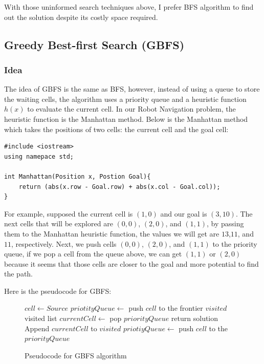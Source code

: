 \documentclass{assignment}
\begin{document}
With those uninformed search techniques above, I prefer BFS algorithm to find out the solution despite its costly space required. 

\subsection{Greedy Best-first Search (GBFS)}

\subsubsection{Idea}
The idea of GBFS is the same as BFS, however, instead of using a queue to store the waiting cells, the algorithm uses a priority queue and a heuristic function $h(x)$ to evaluate the current cell. In our Robot Navigation problem, the heuristic function is the Manhattan method. Below is the Manhattan method which takes the positions of two cells: the current cell and the goal cell:

\begin{lstlisting}[caption={Manhattan Function in C++}]
#include <iostream>
using namepace std;

int Manhattan(Position x, Postion Goal){
	return (abs(x.row - Goal.row) + abs(x.col - Goal.col));
}
\end{lstlisting}

For example, supposed the current cell is $(1, 0)$ and our goal is $(3, 10)$. The next cells that will be explored are $(0, 0)$, $(2, 0)$, and $(1, 1)$, by passing them to the Manhattan heuristic function, the values we will get are $13$,$11$, and $11$, respectively. Next, we push cells $(0, 0)$, $(2, 0)$, and $(1, 1)$ to the priority queue, if we pop a cell from the queue above, we can get $(1, 1)$ or $(2, 0)$ because it seems that those cells are closer to the goal and more potential to find the path.

Here is the pseudocode for GBFS:

\begin{figure}[htbp]
    \centering
    \begin{mdframed}
      \begin{algorithmic}
        \STATE $cell \gets Source$
        \STATE $priotityQueue \gets $ push $cell$ to the frontier
        \STATE $visited$ visited list
            \STATE $currentCell \gets$ pop $priorityQueue$
            	\STATE return solution
            \ENDIF
            \STATE Append $currentCell$ to $visited$ 
                    \STATE $priotiyQueue \gets $ push $cell$ to the $priorityQueue$
                \ENDIF
            \ENDFOR
        \ENDWHILE
      \end{algorithmic}
    \end{mdframed}
    \caption{Pseudocode for GBFS algorithm}
    \label{fig:fig11}
 \end{figure}
\end{document}
